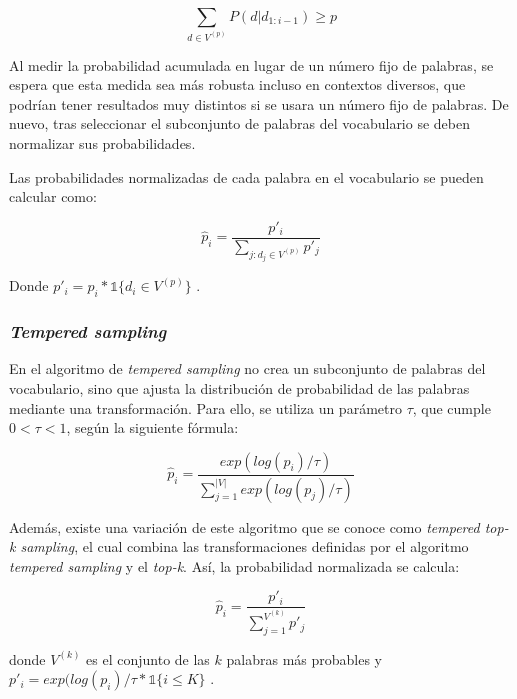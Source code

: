 \documentclass[11pt,spanish,listoffigures,listoftables]{tfgetsinf}
\begin{document}
\begin{equation}
\sum_{d \in V^{(p)}} P(d | d_{1:i-1}) \ge p
\end{equation}

Al medir la probabilidad acumulada en lugar de un número fijo de palabras, se espera que esta medida sea más robusta incluso en contextos diversos, que podrían tener resultados muy distintos si se usara un número fijo de palabras. De nuevo, tras seleccionar el subconjunto de palabras del vocabulario se deben normalizar sus probabilidades.

Las probabilidades normalizadas de cada palabra en el vocabulario se pueden calcular como:

\begin{equation}
\hat{p}_i = \frac{p'_i}{\sum_{j:d_j \in V^{(p)}} p'_j}
\end{equation}

Donde $p'_i = p_i * \mathbb{1}\{ d_i \in V^{(p)} \}$ \cite{nadeem2020systematiccharacterizationsamplingalgorithms}.

\subsubsection{\textit{Tempered sampling}}

En el algoritmo de \textit{tempered sampling} \cite{nadeem2020systematiccharacterizationsamplingalgorithms} no crea un subconjunto de palabras del vocabulario, sino que ajusta la distribución de probabilidad de las palabras mediante una transformación. Para ello, se utiliza un parámetro $\tau$, que cumple $0 < \tau < 1$, según la siguiente fórmula:

\begin{equation}
\hat{p}_i = \frac{exp(log(p_i)/\tau)}{\sum_{j = 1}^{|V|}exp(log(p_j)/\tau)}
\end{equation}

Además, existe una variación de este algoritmo que se conoce como \textit{tempered top-k sampling}, el cual combina las transformaciones definidas por el algoritmo \textit{tempered sampling} y el \textit{top-k}. Así, la probabilidad normalizada se calcula:

\begin{equation}
\hat{p}_i = \frac{p'_i}{\sum_{j = 1}^{V^{(k)}}p'_j}
\end{equation}

donde $V^{(k)}$ es el conjunto de las $k$ palabras más probables y $p'_i = exp(log(p_i)/\tau * \mathbb{1}\{i \leq K\}$ .
\end{document}
